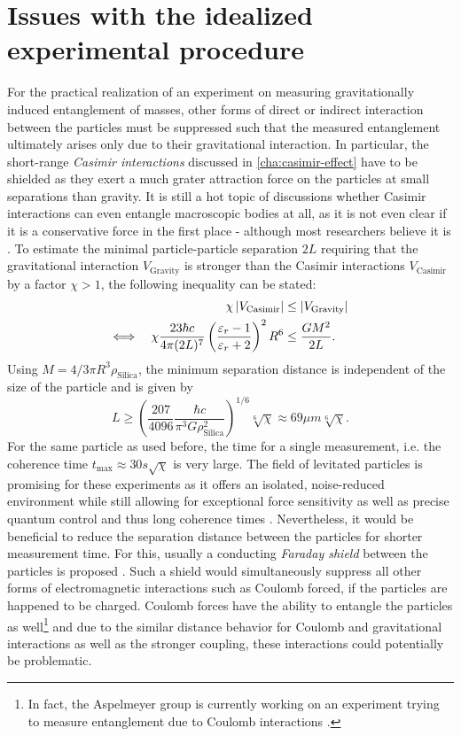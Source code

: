 \section{Issues with the idealized experimental procedure}\label{sec:2:experimental-problems}

For the practical realization of an experiment on measuring gravitationally induced entanglement of masses, other forms of direct or indirect interaction between the particles must be suppressed such that the measured entanglement ultimately arises only due to their gravitational interaction.
In particular, the short-range \emph{Casimir interactions} \cite{Casimir_1948} discussed in \cref{cha:casimir-effect} have to be shielded as they exert a much grater attraction force on the particles at small separations than gravity.
It is still a hot topic of discussions whether Casimir interactions can even entangle macroscopic bodies at all, as it is not even clear if it is a conservative force in the first place - although most researchers believe it is \cite{DeBiase_2012,Yi_2023}.
To estimate the minimal particle-particle separation $2L$ requiring that the gravitational interaction $V_\mathrm{Gravity}$ is stronger than the Casimir interactions $V_\mathrm{Casimir}$ by a factor $\chi > 1$, the following inequality can be stated:
\begin{align}
  \chi \left\lvert V_\mathrm{Casimir}\right\rvert &\leq \left\lvert V_\mathrm{Gravity}\right\rvert \\
  \Longleftrightarrow \quad \chi \frac{23 \hbar c}{4 \pi (2L)^7} \left(\frac{\varepsilon_r - 1}{\varepsilon_r + 2}\right)^2 R^6 &\leq  \frac{G M^2}{2L} .
\end{align}
Using $M = 4/3 \pi R^3\rho_\mathrm{Silica}$, the minimum separation distance is independent of the size of the particle and is given by
\begin{equation}
  L \geq \left(\frac{207}{4096} \frac{\hbar c}{\pi^3 G \rho_\mathrm{Silica}^2}\right)^{1/6} \sqrt[6]{\chi} \approx 69\si{\mu m} \sqrt[6]{\chi} .
\end{equation}
For the same particle as used before, the time for a single measurement, i.e. the coherence time $t_\mathrm{max} \approx 30\si{s} \sqrt{\chi}$ is very large.
The field of levitated particles is promising for these experiments as it offers an isolated, noise-reduced environment while still allowing for exceptional force sensitivity as well as precise quantum control and thus long coherence times \cite{Aspelmeyer_2024,GonzalezBallestero_2021}.
Nevertheless, it would be beneficial to reduce the separation distance between the particles for shorter measurement time.
For this, usually a conducting \emph{Faraday shield} between the particles is proposed \cite{Kamp_2020}.
Such a shield would simultaneously suppress all other forms of electromagnetic interactions such as Coulomb forced, if the particles are happened to be charged.
Coulomb forces have the ability to entangle the particles as well\footnote{In fact, the Aspelmeyer group is currently working on an experiment trying to measure entanglement due to Coulomb interactions \cite{Rudolph_2022}.} and due to the similar distance behavior for Coulomb and gravitational interactions as well as the stronger coupling, these interactions could potentially be problematic.

